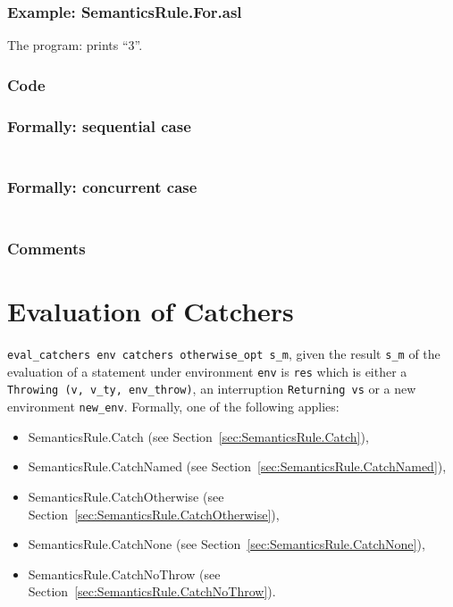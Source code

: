 \documentclass{book}
\begin{document}
    \subsection{Example: SemanticsRule.For.asl}
    The program:
    prints ``3''.

    \subsection{Code}

  \subsection{Formally: sequential case}
  \begin{align}
  \end{align} 

  \subsection{Formally: concurrent case}
  \begin{align}
  \end{align} 

    \subsection{Comments}

\chapter{Evaluation of Catchers \label{chap:eval_catchers}}
\texttt{eval\_catchers env catchers otherwise\_opt s\_m}, given the result
\texttt{s\_m} of the evaluation of a statement under environment \texttt{env}
is \texttt{res} which is either a \texttt{Throwing (v, v\_ty, env\_throw)}, an
interruption \texttt{Returning vs} or a new environment \texttt{new\_env}.
Formally, one of the following applies:
\begin{itemize}
\item SemanticsRule.Catch (see Section~\ref{sec:SemanticsRule.Catch}),
\item SemanticsRule.CatchNamed (see Section~\ref{sec:SemanticsRule.CatchNamed}),
\item SemanticsRule.CatchOtherwise (see Section~\ref{sec:SemanticsRule.CatchOtherwise}),
\item SemanticsRule.CatchNone (see Section~\ref{sec:SemanticsRule.CatchNone}),
\item SemanticsRule.CatchNoThrow (see Section~\ref{sec:SemanticsRule.CatchNoThrow}).
\end{itemize}
\end{document}
